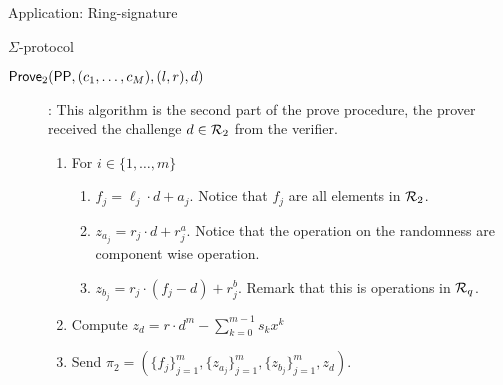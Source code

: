 \begin{section}{Application: Ring-signature}
\begin{subsection}{$\Sigma$-protocol}
\begin{description}
        \item[${\mathsf{Prove}}_2({\mathsf{PP}}, (c_1, \dots, c_M), (l, r), d)$]: This algorithm is the second part of the prove procedure, the prover received the challenge $d \in {\mathcal{R}}_2$ from the verifier.
        \begin{enumerate}
          \item For $i \in \{1, \dots, m\}$
          \begin{enumerate}
            \item $f_j = \ell_j \cdot d + a_j$. Notice that $f_j$ are all elements in ${\mathcal{R}}_2$.
            \item $z_{a_j} = r_j \cdot d + r^a_j$. Notice that the operation on the randomness are component wise operation.
            \item $z_{b_j} = r_j \cdot (f_j - d) + r^b_j$. Remark that this is operations in ${\mathcal{R}}_q$.
          \end{enumerate}
          \item Compute $z_d = r \cdot d^m - \sum_{k = 0}^{m-1}s_k x^k$
          \item Send $\pi_2 = (\{f_j\}_{j = 1}^m, \{z_{a_j}\}_{j = 1}^m, \{z_{b_j}\}_{j = 1}^m, z_d)$.
        \end{enumerate}




\end{description}
\end{subsection}
\end{section}
